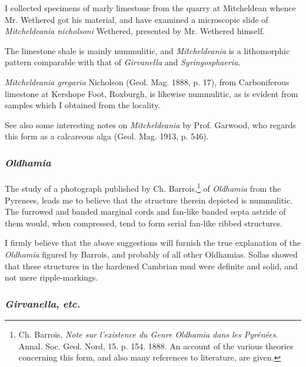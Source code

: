 \documentclass[a4paper, 12pt, oneside, landscape]{article}
\begin{document}
I collected specimens of marly limestone from the quarry at Mitcheldean whence Mr. Wethered got his material, and have examined a microscopic slide of \emph{Mitcheldeania nicholsoni} Wethered, presented by Mr. Wethered himself.

The limestone shale is mainly nummulitic, and \emph{Mitcheldeania} is a lithomorphic pattern comparable with that of \emph{Girvanella} and \emph{Syringosphaeria}.

\emph{Mitcheldeania gregaria} Nicholson (Geol. Mag. 1888, p. 17), from Carboniferous limestone at Kershope Foot, Roxburgh, is likewise nummulitic, as is evident from samples which I obtained from the locality.

See also some interesting notes on \emph{Mitcheldeania} by Prof. Garwood, who regards this form as a calcareous alga (Geol. Mag. 1913, p. 546).

\subsubsection{\emph{Oldhamia}}
\paragraph{}
The study of a photograph published by Ch. Barrois,\footnote{Ch. Barrois, \emph{Note sur l'existence du Genre \emph{Oldhamia} dans les Pyrénées}. Annal. Soc. Geol. Nord, 15. p. 154. 1888. An account of the various theories concerning this form, and also many references to literature, are given.} of \emph{Oldhamia} from the Pyrenees, leads me to believe that the structure therein depicted is nummulitic. The furrowed and banded marginal cords and fan-like banded septa astride of them would, when compressed, tend to form serial fan-like ribbed structures.

I firmly believe that the above suggestions will furnish the true explanation of the \emph{Oldhamia} figured by Barrois, and probably of all other Oldhamias. Sollas showed that these structures in the hardened Cambrian mud were definite and solid, and not mere ripple-markings.

\subsubsection{\emph{Girvanella}, \emph{etc.}}
\end{document}
